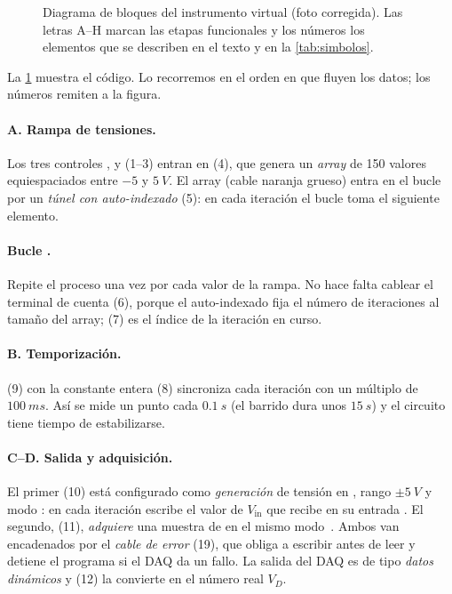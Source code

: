 \documentclass[10pt,a4paper]{article}
\begin{document}
\begin{figure}[htbp]
  \centering
  
  \caption{Diagrama de bloques del instrumento virtual (foto corregida).
  Las letras A--H marcan las etapas funcionales y los números los elementos
  que se describen en el texto y en la \cref{tab:simbolos}.}
  \label{fig:bloques}
\end{figure}

La \cref{fig:bloques} muestra el código. Lo recorremos en el orden en que
fluyen los datos; los números remiten a la figura.

\paragraph{A. Rampa de tensiones.} Los tres controles ,
 y  (1--3) entran en  (4), que
genera un \emph{array} de 150 valores equiespaciados entre $-5$ y $\SI{5}{V}$.
El array (cable naranja grueso) entra en el bucle por un \emph{túnel con
auto-indexado} (5): en cada iteración el bucle toma el siguiente elemento.

\paragraph{Bucle .} Repite el proceso una vez por cada valor de la
rampa. No hace falta cablear el terminal de cuenta  (6), porque el
auto-indexado fija el número de iteraciones al tamaño del array;  (7) es
el índice de la iteración en curso.

\paragraph{B. Temporización.}  (9) con la
constante entera  (8) sincroniza cada iteración con un múltiplo de
$\SI{100}{ms}$. Así se mide un punto cada $\SI{0.1}{s}$ (el barrido dura unos
$\SI{15}{s}$) y el circuito tiene tiempo de estabilizarse.

\paragraph{C--D. Salida y adquisición.} El primer  (10)
está configurado como \emph{generación} de tensión en , rango
$\pm\SI{5}{V}$ y modo : en cada iteración escribe el
valor de $V_{\text{in}}$ que recibe en su entrada . El segundo,
 (11), \emph{adquiere} una muestra de  en el mismo
modo~\cite{ni_daq}. Ambos van encadenados por el \emph{cable de error} (19), que obliga a
escribir antes de leer y detiene el programa si el DAQ da un fallo. La salida
del DAQ es de tipo \emph{datos dinámicos} y 
(12) la convierte en el número real $V_D$.
\end{document}
